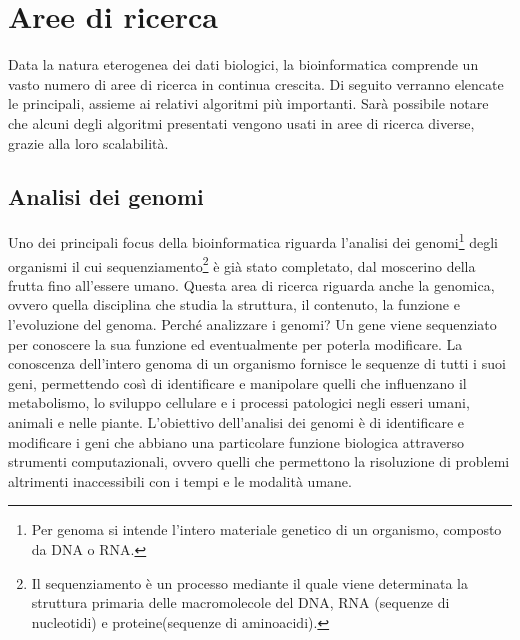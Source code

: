 \section{Aree di ricerca}
Data la natura eterogenea dei dati biologici, la bioinformatica comprende un vasto numero di aree di ricerca in continua crescita. Di seguito verranno elencate le principali, assieme ai relativi algoritmi più importanti. 
\newline
Sarà possibile notare che alcuni degli algoritmi presentati vengono usati in aree di ricerca diverse, grazie alla loro scalabilità.

\subsection{Analisi dei genomi}
Uno dei principali focus della bioinformatica riguarda l'analisi dei genomi\footnote{Per genoma si intende l'intero materiale genetico di un organismo, composto da DNA o RNA.} degli organismi il cui sequenziamento\footnote{Il sequenziamento è un processo mediante il quale viene determinata la struttura primaria delle macromolecole del DNA, RNA (sequenze di nucleotidi) e proteine(sequenze di aminoacidi).} è già stato completato, dal moscerino della frutta fino all'essere umano. Questa area di ricerca riguarda anche la genomica, ovvero quella disciplina che studia la struttura, il contenuto, la funzione e l'evoluzione del genoma.
\newline
Perché analizzare i genomi? Un gene viene sequenziato per conoscere la sua funzione ed eventualmente per poterla modificare. La conoscenza dell'intero genoma di un organismo fornisce le sequenze di tutti i suoi geni, permettendo così di identificare e manipolare quelli che influenzano il metabolismo, lo sviluppo cellulare e i processi patologici negli esseri umani, animali e nelle piante.
\newline
L'obiettivo dell'analisi dei genomi è di identificare e modificare i geni che abbiano una particolare funzione biologica attraverso strumenti computazionali, ovvero quelli che permettono la risoluzione di problemi altrimenti inaccessibili con i tempi e le modalità umane.

